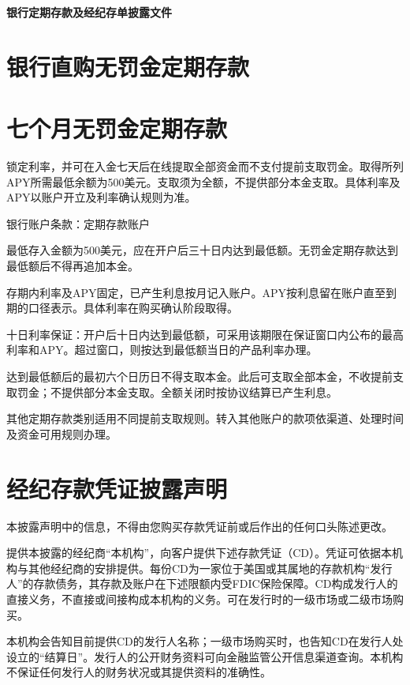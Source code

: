 \documentclass[UTF8,fontset=none,11pt,a4paper]{ctexart}
\begin{document}
{\noindent\LARGE\bfseries 银行定期存款及经纪存单披露文件\par}
\vspace{10pt}
\section*{银行直购无罚金定期存款}
\section*{七个月无罚金定期存款}
锁定利率，并可在入金七天后在线提取全部资金而不支付提前支取罚金。取得所列APY所需最低余额为500美元。支取须为全额，不提供部分本金支取。具体利率及APY以账户开立及利率确认规则为准。


银行账户条款：定期存款账户


最低存入金额为500美元，应在开户后三十日内达到最低额。无罚金定期存款达到最低额后不得再追加本金。


存期内利率及APY固定，已产生利息按月记入账户。APY按利息留在账户直至到期的口径表示。具体利率在购买确认阶段取得。


十日利率保证：开户后十日内达到最低额，可采用该期限在保证窗口内公布的最高利率和APY。超过窗口，则按达到最低额当日的产品利率办理。


达到最低额后的最初六个日历日不得支取本金。此后可支取全部本金，不收提前支取罚金；不提供部分本金支取。全额关闭时按协议结算已产生利息。


其他定期存款类别适用不同提前支取规则。转入其他账户的款项依渠道、处理时间及资金可用规则办理。


\section*{经纪存款凭证披露声明}
本披露声明中的信息，不得由您购买存款凭证前或后作出的任何口头陈述更改。


提供本披露的经纪商“本机构”，向客户提供下述存款凭证（CD）。凭证可依据本机构与其他经纪商的安排提供。每份CD为一家位于美国或其属地的存款机构“发行人”的存款债务，其存款及账户在下述限额内受FDIC保险保障。CD构成发行人的直接义务，不直接或间接构成本机构的义务。可在发行时的一级市场或二级市场购买。


本机构会告知目前提供CD的发行人名称；一级市场购买时，也告知CD在发行人处设立的“结算日”。发行人的公开财务资料可向金融监管公开信息渠道查询。本机构不保证任何发行人的财务状况或其提供资料的准确性。
\end{document}
